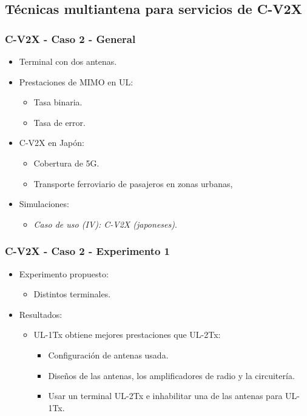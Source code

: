 \documentclass{beamer}
\begin{document}
\subsection{Técnicas multiantena para servicios de C-V2X}

\begin{frame}
\frametitle{C-V2X - Caso 2 - General}

\begin{itemize}
\item Terminal con dos antenas.
\item {
	Prestaciones de MIMO en UL:
	\begin{itemize}
	\item Tasa binaria.
	\item Tasa de error.
	\end{itemize}
}
\item {
	C-V2X en Japón:
	\begin{itemize}
	\item Cobertura de 5G.
	\item Transporte ferroviario de pasajeros en zonas urbanas,
	\end{itemize}
}
\item {
	Simulaciones:
	\begin{itemize}
	\item \textit{Caso de uso (IV): C-V2X (japoneses)}.
	\end{itemize}
}
\end{itemize}
\end{frame}

\begin{frame}
\frametitle{C-V2X - Caso 2 - Experimento 1}

\begin{itemize}
\item {
	Experimento propuesto:
	\begin{itemize}
	\item Distintos terminales.
	\end{itemize}
}
\item {
	Resultados:
	\begin{itemize}
	\item {
		UL-1Tx obtiene mejores prestaciones que UL-2Tx:
		\begin{itemize}
		\item Configuración de antenas usada.
		\item Diseños de las antenas, los amplificadores de radio y la circuitería.
		\item Usar un terminal UL-2Tx e inhabilitar una de las antenas para UL-1Tx.
		\end{itemize}
	}
	\end{itemize}
}
\end{itemize}
\end{frame}
\end{document}

